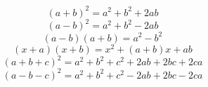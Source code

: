 \documentclass{article}
\begin{document}
    $$(a + b)^2 = a^2 + b^2 + 2ab$$
$$(a - b)^2 = a^2 + b^2 - 2ab$$
$$(a - b) (a + b) = a^2 - b^2$$
$$(x + a) (x + b) = x^2 + (a + b) x + ab$$
$$(a + b + c)^2 = a^2 + b^2 + c^2 + 2ab + 2bc + 2ca$$
$$(a - b - c)^2 = a^2 + b^2 + c^2 - 2ab + 2bc - 2ca$$

    
\end{document}
